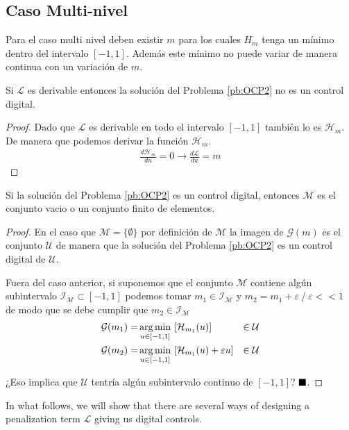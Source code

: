 \subsection{Caso Multi-nivel}
Para el caso multi nivel deben existir $m$ para los cuales $H_m$ tenga un mínimo dentro del intervalo $[-1,1]$. Además este mínimo no puede variar de manera continua con un variación de $m$.
\vspace{1em}
\begin{proposition}
    Si $\mathcal{L}$ es derivable entonces la solución del Problema \ref{pb:OCP2} no es un control digital.
\end{proposition}
\begin{proof}
    Dado que $\mathcal{L}$ es derivable en todo el intervalo $[-1,1]$ también lo es $\mathcal{H}_m$. De manera que podemos derivar la función $\mathcal{H}_m$.
    \begin{gather}
        \frac{d \mathcal{H}_m}{du} = 0 \rightarrow
        \frac{d \mathcal{L}}{du} = m
    \end{gather}
\end{proof}
\vspace{1em}
\begin{proposition}
    Si la solución del Problema \ref{pb:OCP2} es un control digital, entonces $\mathcal{M}$ es el conjunto vacio o  un conjunto finito de elementos. 
\end{proposition}
\begin{proof}

En el caso que $\mathcal{M} = \{\emptyset\}$ por definición de $\mathcal{M}$ la imagen de $\mathcal{G}(m)$ es el conjunto $\mathcal{U}$ de manera que la solución del Problema \ref{pb:OCP2} es un control digital de $\mathcal{U}$.  

Fuera del caso anterior, si suponemos que el conjunto $\mathcal{M}$ contiene algún subintervalo $\mathcal{I}_{\mathcal{M}} \subset[-1,1]$ podemos tomar    $m_1 \in \mathcal{I}_{\mathcal{M}}$ y $ m_2 = m_1 + \varepsilon \ / \ \varepsilon << 1$ de modo que se debe cumplir que $m_2 \in \mathcal{I}_{\mathcal{M}}$
\begin{equation}
    \begin{aligned}
        \mathcal{G}(m_1) = & \argmin_{u\in[-1,1]} \ [\mathcal{H}_{m_1}(u)] & \in \mathcal{U}\\
        \mathcal{G}(m_2) = & \argmin_{u\in[-1,1]} \ [\mathcal{H}_{m_1}(u) + \varepsilon u]   & \in \mathcal{U} 
    \end{aligned}      
\end{equation}

¿Eso implica que $\mathcal{U}$ tentría algún subintervalo continuo de $[-1,1]$?
$\hfill\blacksquare$.
\end{proof} 



In what follows, we will show that there are several ways of designing a penalization term $\mathcal L$ giving us digital controls.

%